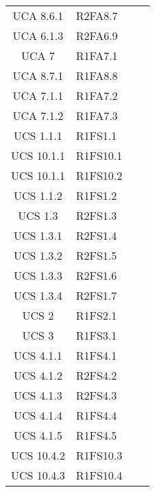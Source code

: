 {\begin{longtable}{ c C{4cm} c c}
UCA 8.6.1 & R2FA8.7\\

UCA 6.1.3 & R2FA6.9\\

UCA 7 & R1FA7.1\\

UCA 8.7.1 & R1FA8.8\\

UCA 7.1.1 & R1FA7.2\\

UCA 7.1.2 & R1FA7.3\\

UCS 1.1.1 & R1FS1.1\\

UCS 10.1.1 & R1FS10.1\\


UCS 10.1.1 & R1FS10.2\\

UCS 1.1.2 & R1FS1.2\\

UCS 1.3 & R2FS1.3\\

UCS 1.3.1 & R2FS1.4\\

UCS 1.3.2 & R2FS1.5\\

UCS 1.3.3 & R2FS1.6\\

UCS 1.3.4 & R2FS1.7\\

UCS 2 & R1FS2.1\\

UCS 3 & R1FS3.1\\


UCS 4.1.1 & R1FS4.1\\

UCS 4.1.2 & R2FS4.2\\

UCS 4.1.3 & R2FS4.3\\

UCS 4.1.4 & R1FS4.4\\

UCS 4.1.5 & R1FS4.5\\



UCS 10.4.2 & R1FS10.3\\

UCS 10.4.3 & R1FS10.4\\


\end{longtable}}
